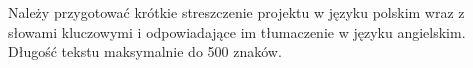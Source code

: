 Należy przygotować krótkie streszczenie projektu w języku polskim wraz z słowami kluczowymi i odpowiadające im tłumaczenie w języku angielskim. Długość tekstu maksymalnie do 500 znaków.
